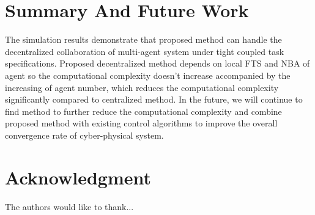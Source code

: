 \documentclass[journal]{IEEEtran}
\begin{document}
\section{Summary And Future Work}

The simulation results demonstrate that proposed method can handle the decentralized collaboration of multi-agent system under tight coupled task specifications. Proposed decentralized method depends on local FTS and NBA of agent so the computational complexity doesn't increase accompanied by the increasing of agent number, which reduces the computational complexity significantly compared to centralized method. In the future, we will continue to find method to further reduce the computational complexity and combine proposed method with existing control algorithms to improve the overall convergence rate of cyber-physical system.


\section*{Acknowledgment}


The authors would like to thank...


\ifCLASSOPTIONcaptionsoff
  \newpage
\fi




\end{document}
